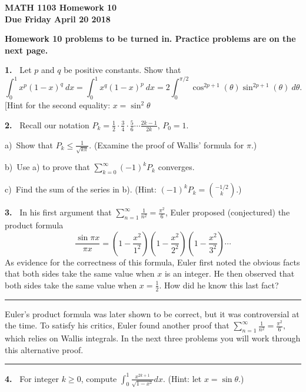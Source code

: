 \documentclass[12pt]{article}
\theoremstyle{definition}
\theoremstyle{remark}
\theoremstyle{definition}
\newenvironment{Solution}{\noindent\textbf{Solution.}}{}
\begin{document}
  

{\bf MATH 1103 Homework 10 }\\
{\bf Due Friday April 20 2018}



{\bf Homework 10 problems to be turned in. Practice problems are on the next page.}



{\bf 1.\ } Let $p$ and $q$ be positive constants. Show that 
\[
\int_0^1x^p(1-x)^q\ dx=\int_0^1x^q(1-x)^p\ dx
=2\int_0^{\pi/2}\cos^{2p+1}(\theta)\sin^{2p+1}(\theta)\ d\theta.
\]
[Hint for the second equality: $x=\sin^2\theta$


{\bf 2.\ } Recall our notation $P_k=\frac{1}{2}\cdot \frac{3}{4}\cdot \frac{5}{6}\cdots\frac{2k-1}{2k}$, $P_0=1$. 

a)\ Show that $P_k\leq\frac{1}{\sqrt{k\pi}}$. (Examine the proof of Wallis' formula for $\pi$.)

b)\ Use a) to prove that $\sum_{k=0}^\infty (-1)^kP_k$ converges. 

c)\ Find the sum of the series in b). (Hint: $(-1)^kP_k=\binom{-1/2}{k}$.)


{\bf 3.\ } In his first argument that $\sum\limits_{n=1}^\infty \frac{1}{n^2}=\frac{\pi^2}{6}$, Euler proposed (conjectured) the product formula 
\[ \frac{\sin\pi x}{\pi x}=
\left(1-\frac{x^2}{1^2}\right)\left(1-\frac{x^2}{2^2}\right)
\left(1-\frac{x^2}{3^2}\right)\cdots
\]
As evidence for the correctness of this formula, Euler first noted the obvious facts that both sides take the same value when $x$ is an integer. He then observed that both sides take the same value when $x=\frac{1}{2}$. How did he know this last fact? 

\rule{\textwidth}{1pt}

Euler's product formula was later shown to be correct, but it was controversial at the time. 
To satisfy his critics,  Euler found another proof that  
$\sum\limits_{n=1}^\infty\frac{1}{n^2}=\frac{\pi^2}{6},$
which relies on Wallis integrals. 
In the next three problems you will work through this alternative proof. 

\rule{\textwidth}{1pt}

{\bf 4.\ } For integer $k\geq 0$, compute $\displaystyle \int_0^1\frac{x^{2k+1}}{\sqrt{1-x^2}} dx$. (Hint: let $x=\sin\theta$.)
\end{document}
